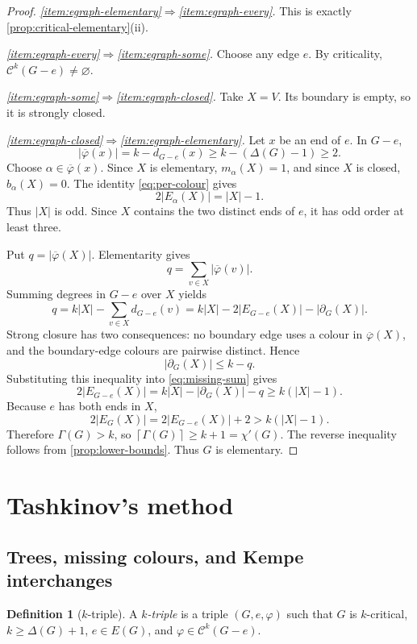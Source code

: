 \documentclass[11pt]{article}
\theoremstyle{definition}
\newtheorem{definition}[theorem]{Definition}
\newcommand{\calC}{\mathcal C}
\newcommand{\abs}[1]{\lvert #1\rvert}
\newcommand{\ceil}[1]{\left\lceil #1\right\rceil}
\newcommand{\missing}[1]{\overline{#1}}
\newcommand{\boundary}{\partial}
\begin{document}
\begin{proof}
\emph{\cref{item:egraph-elementary}$\Rightarrow$\cref{item:egraph-every}.}
This is exactly \cref{prop:critical-elementary}(ii).

\emph{\cref{item:egraph-every}$\Rightarrow$\cref{item:egraph-some}.}
Choose any edge $e$.  By criticality, $\calC^k(G-e)\neq\varnothing$.

\emph{\cref{item:egraph-some}$\Rightarrow$\cref{item:egraph-closed}.}
Take $X=V$.  Its boundary is empty, so it is strongly closed.

\emph{\cref{item:egraph-closed}$\Rightarrow$\cref{item:egraph-elementary}.}
Let $x$ be an end of $e$.  In $G-e$,
\[
  \abs{\missing\varphi(x)}
  =k-d_{G-e}(x)
  \ge k-(\Delta(G)-1)
  \ge 2.
\]
Choose $\alpha\in\missing\varphi(x)$.  Since $X$ is elementary,
$m_\alpha(X)=1$, and since $X$ is closed, $b_\alpha(X)=0$.  The identity
\eqref{eq:per-colour} gives
\[
  2\abs{E_\alpha(X)}=\abs X-1.
\]
Thus $\abs X$ is odd.  Since $X$ contains the two distinct ends of $e$, it has
odd order at least three.

Put $q=\abs{\missing\varphi(X)}$.  Elementarity gives
\[
  q=\sum_{v\in X}\abs{\missing\varphi(v)}.
\]
Summing degrees in $G-e$ over $X$ yields
\[
  q
  =k\abs X-\sum_{v\in X}d_{G-e}(v)
  =k\abs X-2\abs{E_{G-e}(X)}-\abs{\boundary_G(X)}.
  \tag{3.4}\label{eq:missing-sum}
\]
Strong closure has two consequences: no boundary edge uses a colour in
$\missing\varphi(X)$, and the boundary-edge colours are pairwise distinct.
Hence
\[
  \abs{\boundary_G(X)}\le k-q.
\]
Substituting this inequality into \eqref{eq:missing-sum} gives
\[
  2\abs{E_{G-e}(X)}
  =k\abs X-\abs{\boundary_G(X)}-q
  \ge k(\abs X-1).
\]
Because $e$ has both ends in $X$,
\[
  2\abs{E_G(X)}=2\abs{E_{G-e}(X)}+2>k(\abs X-1).
\]
Therefore $\Gamma(G)>k$, so
$\ceil{\Gamma(G)}\ge k+1=\chi'(G)$.  The reverse inequality follows from
\cref{prop:lower-bounds}.  Thus $G$ is elementary.
\end{proof}

\section{Tashkinov's method}

\subsection{Trees, missing colours, and Kempe interchanges}

\begin{definition}[$k$-triple]
A \emph{$k$-triple} is a triple $(G,e,\varphi)$ such that $G$ is $k$-critical,
$k\ge\Delta(G)+1$, $e\in E(G)$, and
$\varphi\in\calC^k(G-e)$.
\end{definition}
\end{document}
